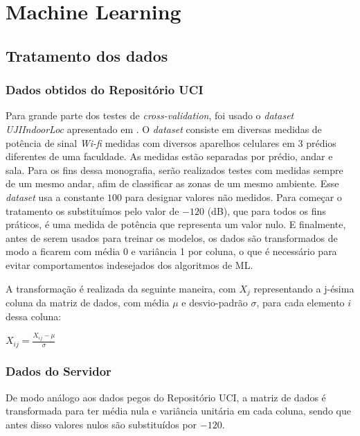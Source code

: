 \chapter{Machine Learning}\label{chp:ml}


\section{Tratamento dos dados}\label{sec:data1}

\subsection{Dados obtidos do Repositório UCI}
	Para grande parte dos testes de \textit{cross-validation}, foi usado o \textit{dataset}  \textit{UJIIndoorLoc} apresentado em \cite{uji}. O \textit{dataset} consiste em diversas medidas de potência de sinal \textit{Wi-fi} medidas com diversos aparelhos celulares em 3 prédios diferentes de uma faculdade. As medidas estão separadas por prédio, andar e sala. Para os fins dessa monografia, serão realizados testes com medidas sempre de um mesmo andar, afim de classificar as zonas de um mesmo ambiente.  Esse  \textit{dataset} usa a constante $100$ para designar valores não medidos. Para começar o tratamento os substituímos pelo valor de $-120$ (dB), que para todos os fins práticos, é uma medida de potência que representa um valor nulo. E finalmente, antes de serem usados para treinar os modelos, os dados são transformados de modo a ficarem com média 0 e variância 1 por coluna, o que é necessário para evitar comportamentos indesejados dos algoritmos de ML.
	
A transformação é realizada da seguinte maneira, com $X_j$ representando a j-ésima coluna da matriz de dados, com média $\mu$ e desvio-padrão $\sigma$, para cada elemento $i$ dessa coluna:

\begin{center}
$X_{ij}=\frac{X_{ij}-\mu}{\sigma}$	
\end{center}

\subsection{Dados do Servidor}	

De modo análogo aos dados pegos do Repositório UCI, a matriz de dados é transformada para ter média nula e variância unitária em cada coluna, sendo que antes disso valores nulos são substituídos por $-120$.




